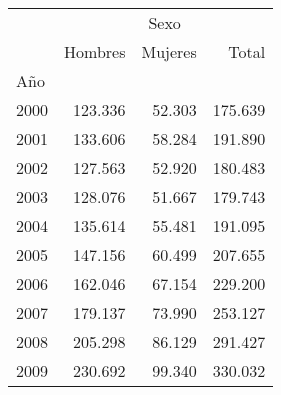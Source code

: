 \begin{tabular}{llll}
\cline{1-4}
\multicolumn{1}{c}{} &
  \multicolumn{3}{|c}{Sexo} \\
\multicolumn{1}{c}{} &
  \multicolumn{1}{|r}{Hombres} &
  \multicolumn{1}{r}{Mujeres} &
  \multicolumn{1}{r}{Total} \\
\cline{1-4}
\multicolumn{1}{l}{Año} &
  \multicolumn{1}{|r}{} &
  \multicolumn{1}{r}{} &
  \multicolumn{1}{r}{} \\
\multicolumn{1}{l}{\hspace{1em}2000} &
  \multicolumn{1}{|r}{123.336} &
  \multicolumn{1}{r}{52.303} &
  \multicolumn{1}{r}{175.639} \\
\multicolumn{1}{l}{\hspace{1em}2001} &
  \multicolumn{1}{|r}{133.606} &
  \multicolumn{1}{r}{58.284} &
  \multicolumn{1}{r}{191.890} \\
\multicolumn{1}{l}{\hspace{1em}2002} &
  \multicolumn{1}{|r}{127.563} &
  \multicolumn{1}{r}{52.920} &
  \multicolumn{1}{r}{180.483} \\
\multicolumn{1}{l}{\hspace{1em}2003} &
  \multicolumn{1}{|r}{128.076} &
  \multicolumn{1}{r}{51.667} &
  \multicolumn{1}{r}{179.743} \\
\multicolumn{1}{l}{\hspace{1em}2004} &
  \multicolumn{1}{|r}{135.614} &
  \multicolumn{1}{r}{55.481} &
  \multicolumn{1}{r}{191.095} \\
\multicolumn{1}{l}{\hspace{1em}2005} &
  \multicolumn{1}{|r}{147.156} &
  \multicolumn{1}{r}{60.499} &
  \multicolumn{1}{r}{207.655} \\
\multicolumn{1}{l}{\hspace{1em}2006} &
  \multicolumn{1}{|r}{162.046} &
  \multicolumn{1}{r}{67.154} &
  \multicolumn{1}{r}{229.200} \\
\multicolumn{1}{l}{\hspace{1em}2007} &
  \multicolumn{1}{|r}{179.137} &
  \multicolumn{1}{r}{73.990} &
  \multicolumn{1}{r}{253.127} \\
\multicolumn{1}{l}{\hspace{1em}2008} &
  \multicolumn{1}{|r}{205.298} &
  \multicolumn{1}{r}{86.129} &
  \multicolumn{1}{r}{291.427} \\
\multicolumn{1}{l}{\hspace{1em}2009} &
  \multicolumn{1}{|r}{230.692} &
  \multicolumn{1}{r}{99.340} &
  \multicolumn{1}{r}{330.032} \\

\end{tabular}
